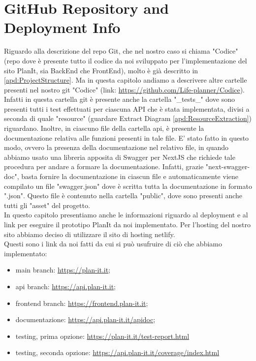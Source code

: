 \section{GitHub Repository and Deployment Info}
\label{secD4:GitHubRepositoryAndDeploymentInfo}
Riguardo alla descrizione del repo Git, che nel nostro caso si chiama "Codice" (repo dove è presente tutto il codice da noi sviluppato per l'implementazione del sito PlanIt, sia BackEnd che FrontEnd), molto è già descritto in \ref{apd:ProjectStructure}. Ma in questa capitolo andiamo a descrivere altre cartelle presenti nel nostro git "Codice" (link: \href{https://github.com/Life-planner/Codice} {https://github.com/Life-planner/Codice}). Infatti in questa cartella git è presente anche la cartella "\_tests\_" dove sono presenti tutti i test effettuati per ciascuna API che è stata implementata, divisi a seconda di quale "resource" (guardare Extract Diagram \ref{apd:ResourceExtraction}) riguardano. Inoltre, in  ciascuno file della cartella api, è presente la documentazione relativa alle funzioni presenti in tale file. E' stato fatto in questo modo, ovvero la presenza della documentazione nel relativo file, in quando abbiamo usato una libreria apposita di Swagger per NextJS che richiede tale procedura per andare a formare la documentazione. Infatti, grazie "next-swagger-doc", basta fornire la documentazione in ciascun file e automaticamente viene compilato un file "swagger.json" dove è scritta tutta la documentazione in formato ".json". Questo file è contenuto nella cartella "public", dove sono presenti anche tutti gli "asset" del progetto.\\
In questo capitolo presentiamo anche le informazioni riguardo al deployment e al link per eseguire il prototipo PlanIt da noi implementato. Per l'hosting del nostro sito abbiamo deciso di utilizzare il sito di hosting netlify. \\ Questi sono i link da noi fatti da cui si può usufruire di ciò che abbiamo implementato:
\begin{itemize}
    \item main branch: \href{https://plan-it.it} {https://plan-it.it};
    \item api branch: \href{https://api.plan-it.it} {https://api.plan-it.it};
    \item frontend branch: \href{https://frontend.plan-it.it} {https://frontend.plan-it.it};
    \item documentazione: \href{https://api.plan-it.it/apidoc} {https://api.plan-it.it/apidoc};
    \item testing, prima opzione: \href{https://plan-it.it/test-report.html} {https://plan-it.it/test-report.html}
    \item testing, seconda opzione: \href{https://api.plan-it.it/coverage/index.html} {https://api.plan-it.it/coverage/index.html}

\end{itemize}

